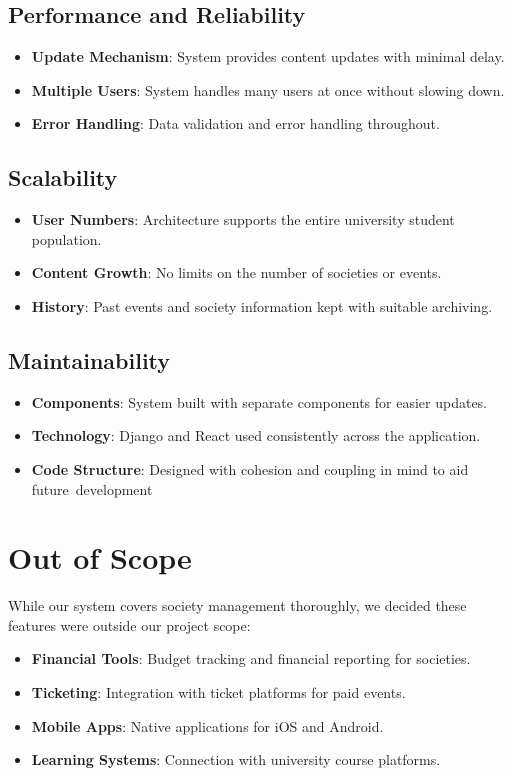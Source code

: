\subsection{Performance and Reliability}
\begin{itemize}
    \item \textbf{Update Mechanism}: System provides content updates with minimal delay.
    \item \textbf{Multiple Users}: System handles many users at once without slowing down.
    \item \textbf{Error Handling}: Data validation and error handling throughout.
\end{itemize}

\subsection{Scalability}
\begin{itemize}
    \item \textbf{User Numbers}: Architecture supports the entire university student population.
    \item \textbf{Content Growth}: No limits on the number of societies or events.
    \item \textbf{History}: Past events and society information kept with suitable archiving.
\end{itemize}

\subsection{Maintainability}
\begin{itemize}
    \item \textbf{Components}: System built with separate components for easier updates.
    \item \textbf{Technology}: Django and React used consistently across the application.
    \item \textbf{Code Structure}: Designed with cohesion and coupling in mind to aid future development
\end{itemize}

\section{Out of Scope}
While our system covers society management thoroughly, we decided these features were outside our project scope:

\begin{itemize}
    \item \textbf{Financial Tools}: Budget tracking and financial reporting for societies.
    \item \textbf{Ticketing}: Integration with ticket platforms for paid events.
    \item \textbf{Mobile Apps}: Native applications for iOS and Android.
    \item \textbf{Learning Systems}: Connection with university course platforms.
\end{itemize}